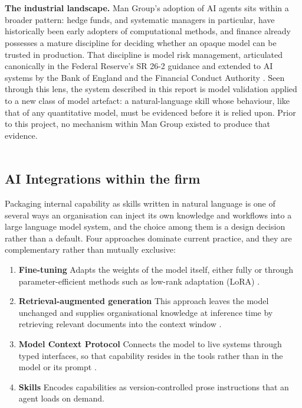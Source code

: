 \\\\
\textbf{The industrial landscape.} Man Group's adoption of AI agents sits within a broader pattern: hedge funds, and systematic managers in particular, have historically been early adopters of computational methods, and finance already possesses a mature discipline for deciding whether an opaque model can be trusted in production. That discipline is model risk management, articulated canonically in the Federal Reserve's SR 26-2 guidance \cite{federalreserve2026sr262} and extended to AI systems by the Bank of England and the Financial Conduct Authority \cite{bankofengland2022dp522}. Seen through this lens, the system described in this report is model validation applied to a new class of model artefact: a natural-language skill whose behaviour, like that of any quantitative model, must be evidenced before it is relied upon. Prior to this project, no mechanism within Man Group existed to produce that evidence.
\\\\
\subsection{AI Integrations within the firm}
Packaging internal capability as skills written in natural language is one of several ways an organisation can inject its own knowledge and workflows into a large language model system, and the choice among them is a design decision rather than a default. Four approaches dominate current practice, and they are complementary rather than mutually exclusive:

\begin{enumerate}
    \item \textbf{Fine-tuning} Adapts the weights of the model itself, either fully or through parameter-efficient methods such as low-rank adaptation (LoRA) \cite{hu2022lora}.
    \item \textbf{Retrieval-augmented generation} This approach leaves the model unchanged and supplies organisational knowledge at inference time by retrieving relevant documents into the context window \cite{lewis2020rag}.
    \item \textbf{Model Context Protocol} Connects the model to live systems through typed interfaces, so that capability resides in the tools rather than in the model or its prompt \cite{anthropic2024mcp}.
    \item \textbf{Skills} Encodes capabilities as version-controlled prose instructions that an agent loads on demand.
\end{enumerate}

